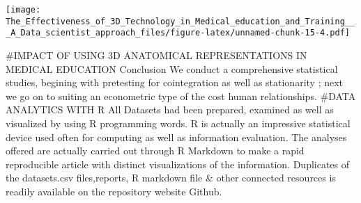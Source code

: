 \documentclass[]{article}
\newenvironment{Shaded}{\begin{snugshade}}{\end{snugshade}}
\newcommand{\DataTypeTok}[1]{\textcolor[rgb]{0.13,0.29,0.53}{#1}}
\newcommand{\KeywordTok}[1]{\textcolor[rgb]{0.13,0.29,0.53}{\textbf{#1}}}
\newcommand{\NormalTok}[1]{#1}
\newcommand{\OperatorTok}[1]{\textcolor[rgb]{0.81,0.36,0.00}{\textbf{#1}}}
\newcommand{\StringTok}[1]{\textcolor[rgb]{0.31,0.60,0.02}{#1}}
\begin{document}
\begin{Shaded}
\end{Shaded}

\texttt{[image: The\_Effectiveness\_of\_3D\_Technology\_in\_Medical\_education\_and\_Training\_\_\_A\_Data\_scientist\_approach\_files/figure-latex/unnamed-chunk-15-4.pdf]}

\#IMPACT OF USING 3D ANATOMICAL REPRESENTATIONS IN MEDICAL EDUCATION
Conclusion We conduct a comprehensive statistical studies, begining with
pretesting for cointegration as well as stationarity ; next we go on to
suiting an econometric type of the cost human relationships. \#DATA
ANALYTICS WITH R All Datasets had been prepared, examined as well as
visualized by using R programming words. R is actually an impressive
statistical device used often for computing as well as information
evaluation. The analyses offered are actually carried out through R
Markdown to make a rapid reproducible article with distinct
visualizations of the information. Duplicates of the datasets.csv
files,reports, R markdown file \& other connected resources is readily
available on the repository website Github.
\end{document}
